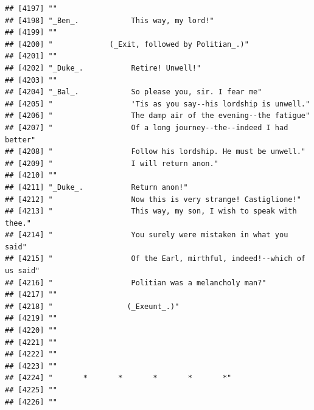 \documentclass{article}\usepackage[]{graphicx}\usepackage[]{color}
\makeatletter
\newenvironment{kframe}{%
 \def\at@end@of@kframe{}%
 \ifinner\ifhmode%
  \def\at@end@of@kframe{\end{minipage}}%
  \begin{minipage}{\columnwidth}%
 \fi\fi%
 \def\FrameCommand##1{\hskip\@totalleftmargin \hskip-\fboxsep
 \colorbox{shadecolor}{##1}\hskip-\fboxsep
     \hskip-\linewidth \hskip-\@totalleftmargin \hskip\columnwidth}%
 \MakeFramed {\advance\hsize-\width
   \@totalleftmargin\z@ \linewidth\hsize
   \@setminipage}}%
 {\par\unskip\endMakeFramed%
 \at@end@of@kframe}
\newenvironment{knitrout}{}{} %
\makeatother
\begin{document}
\begin{knitrout}
\begin{kframe}
\begin{verbatim}
## [4197] ""                                                                            
## [4198] "_Ben_.            This way, my lord!"                                        
## [4199] ""                                                                            
## [4200] "             (_Exit, followed by Politian_.)"                                
## [4201] ""                                                                            
## [4202] "_Duke_.           Retire! Unwell!"                                           
## [4203] ""                                                                            
## [4204] "_Bal_.            So please you, sir. I fear me"                             
## [4205] "                  'Tis as you say--his lordship is unwell."                  
## [4206] "                  The damp air of the evening--the fatigue"                  
## [4207] "                  Of a long journey--the--indeed I had better"               
## [4208] "                  Follow his lordship. He must be unwell."                   
## [4209] "                  I will return anon."                                       
## [4210] ""                                                                            
## [4211] "_Duke_.           Return anon!"                                              
## [4212] "                  Now this is very strange! Castiglione!"                    
## [4213] "                  This way, my son, I wish to speak with thee."              
## [4214] "                  You surely were mistaken in what you said"                 
## [4215] "                  Of the Earl, mirthful, indeed!--which of us said"          
## [4216] "                  Politian was a melancholy man?"                            
## [4217] ""                                                                            
## [4218] "                 (_Exeunt_.)"                                                
## [4219] ""                                                                            
## [4220] ""                                                                            
## [4221] ""                                                                            
## [4222] ""                                                                            
## [4223] ""                                                                            
## [4224] "       *       *       *       *       *"                                    
## [4225] ""                                                                            
## [4226] ""                                                                            

\end{verbatim}
\end{kframe}
\end{knitrout}
\end{document}
